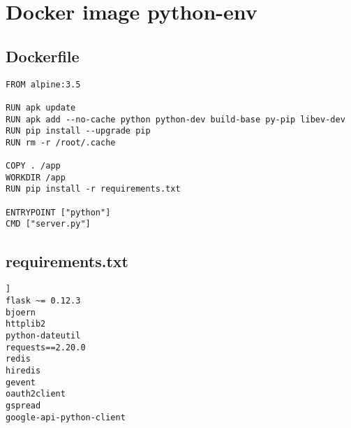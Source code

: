 \section{Docker image python-env}
\label{sec:docker-fission}
\subsection{Dockerfile}
\label{sec:dockerfile-fission}
\begin{lstlisting}
FROM alpine:3.5

RUN apk update
RUN apk add --no-cache python python-dev build-base py-pip libev-dev
RUN pip install --upgrade pip
RUN rm -r /root/.cache

COPY . /app
WORKDIR /app
RUN pip install -r requirements.txt

ENTRYPOINT ["python"]
CMD ["server.py"]
\end{lstlisting}

\subsection{requirements.txt}
\label{sec:requirements-fission}
\begin{lstlisting}]
flask ~= 0.12.3
bjoern
httplib2
python-dateutil
requests==2.20.0
redis
hiredis
gevent
oauth2client
gspread
google-api-python-client
\end{lstlisting}
